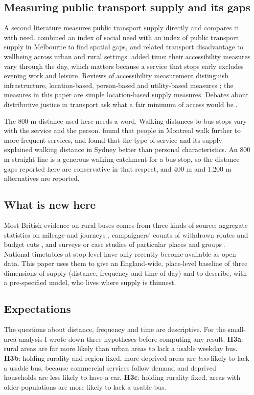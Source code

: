 \documentclass[11pt,a4paper]{article}
\begin{document}
\subsection{Measuring public transport supply and its gaps}
A second literature measures public transport supply directly and compares it with need. \citet{currie2010} combined an index of social need with an index of public transport supply in Melbourne to find spatial gaps, and \citet{delbosc2011} related transport disadvantage to wellbeing across urban and rural settings. \citet{fransen2015} added time: their accessibility measures vary through the day, which matters because a service that stops early excludes evening work and leisure. Reviews of accessibility measurement distinguish infrastructure, location-based, person-based and utility-based measures \citep{geurs2004}; the measures in this paper are simple location-based supply measures. Debates about distributive justice in transport ask what a fair minimum of access would be \citep{pereira2017}.

The 800 m distance used here needs a word. Walking distances to bus stops vary with the service and the person. \citet{elgeneidy2014} found that people in Montreal walk further to more frequent services, and \citet{daniels2013} found that the type of service and its supply explained walking distance in Sydney better than personal characteristics. An 800 m straight line is a generous walking catchment for a bus stop, so the distance gaps reported here are conservative in that respect, and 400 m and 1,200 m alternatives are reported.

\subsection{What is new here}
Most British evidence on rural buses comes from three kinds of source: aggregate statistics on mileage and journeys \citep{dft2025}, campaigners' counts of withdrawn routes and budget cuts \citep{cbt2018}, and surveys or case studies of particular places and groups \citep{shergold2012,gray2006}. National timetables at stop level have only recently become available as open data. This paper uses them to give an England-wide, place-level baseline of three dimensions of supply (distance, frequency and time of day) and to describe, with a pre-specified model, who lives where supply is thinnest.

\subsection{Expectations}
The questions about distance, frequency and time are descriptive. For the small-area analysis I wrote down three hypotheses before computing any result. \textbf{H3a}: rural areas are far more likely than urban areas to lack a usable weekday bus. \textbf{H3b}: holding rurality and region fixed, more deprived areas are \textit{less} likely to lack a usable bus, because commercial services follow demand and deprived households are less likely to have a car. \textbf{H3c}: holding rurality fixed, areas with older populations are more likely to lack a usable bus.
\end{document}
